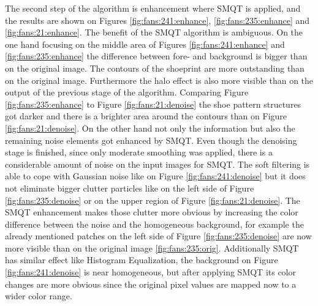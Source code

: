 \documentclass[draft,final]{vutinfth} %
\begin{document}
\par
The second step of the algorithm is enhancement where SMQT is applied, and the results are shown on Figures \ref{fig:fans:241:enhance}, \ref{fig:fans:235:enhance} and \ref{fig:fans:21:enhance}.
The benefit of the SMQT algorithm is ambiguous.
On the one hand focusing on the middle area of Figures  \ref{fig:fans:241:enhance} and \ref{fig:fans:235:enhance} the difference between fore- and background is bigger than on the original image.
The contours of the shoeprint are more outstanding than on the original image.
Furthermore the halo effect is also more visible than on the output of the previous stage of the algorithm.
Comparing Figure \ref{fig:fans:235:enhance} to Figure \ref{fig:fans:21:denoise} the shoe pattern structures got darker and there is a brighter area around the contours than on Figure \ref{fig:fans:21:denoise}.
On the other hand not only the information but also the remaining noise elements got enhanced by SMQT.
Even though the denoising stage is finished, since only moderate smoothing was applied, there is a considerable amount of noise on the input images for SMQT.
The soft filtering is able to cope with Gaussian noise like on Figure \ref{fig:fans:241:denoise} but it does not eliminate bigger clutter particles like on the left side of Figure \ref{fig:fans:235:denoise} or on the upper region of Figure \ref{fig:fans:21:denoise}.
The SMQT enhancement makes those clutter more obvious by increasing the color difference between the noise and the homogeneous background, for example the already mentioned patches on the left side of Figure \ref{fig:fans:235:denoise} are now more visible than on the original image \ref{fig:fans:235:orig}.
Additionally SMQT has similar effect like Histogram Equalization, the background on Figure \ref{fig:fans:241:denoise} is near homogeneous, but after applying SMQT its color changes are more obvious since the original pixel values are mapped now to a wider color range.
\end{document}
